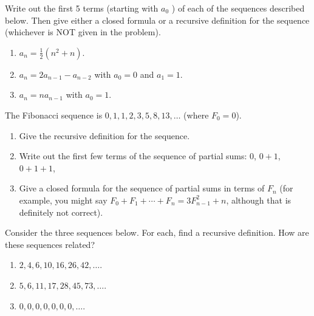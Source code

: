 \documentclass[11pt,]{book}
\theoremstyle{ptxplainnotitle}
\theoremstyle{ptxplaintitle}
\theoremstyle{ptxdefinitionnotitle}
\theoremstyle{ptxdefinitiontitle}
\theoremstyle{ptxdefinitionnotitle}
\theoremstyle{ptxdefinitiontitle}
\theoremstyle{ptxdefinitionnotitle}
\theoremstyle{ptxdefinitiontitle}
\theoremstyle{ptxdefinitiontitlenonumber}
\theoremstyle{ptxdefinitiontitlenonumber}
\numberwithin{equation}{chapter}
\begin{document}
\begin{divisionexercise}{3}\hypertarget{exercise-3}{}
\hypertarget{p-121}{}%
Write out the first 5 terms (starting with \(a_0\) ) of each of the sequences described below.  Then give either a closed formula or a recursive definition for the sequence (whichever is NOT given in the problem). \leavevmode%
\begin{enumerate}[label=(\alph*)]
\item\hypertarget{li-82}{}\hypertarget{p-122}{}%
\(a_n = \frac{1}{2}(n^2 + n)\).%
\item\hypertarget{li-83}{}\hypertarget{p-123}{}%
\(a_n = 2a_{n-1} - a_{n-2}\) with \(a_0 = 0\) and \(a_1 = 1\).%
\item\hypertarget{li-84}{}\hypertarget{p-124}{}%
\(a_n = na_{n-1}\) with \(a_0 = 1\).%
\end{enumerate}
%
\end{divisionexercise}%
\begin{divisionexercise}{4}\hypertarget{exercise-4}{}
\hypertarget{p-129}{}%
The Fibonacci sequence is \(0, 1, 1, 2, 3, 5, 8, 13, \ldots\) (where \(F_0 = 0\)).%
\par
\hypertarget{p-130}{}%
\leavevmode%
\begin{enumerate}[label=(\alph*)]
\item\hypertarget{li-88}{}\hypertarget{p-131}{}%
Give the recursive definition for the sequence.%
\item\hypertarget{li-89}{}\hypertarget{p-132}{}%
Write out the first few terms of the sequence of partial sums: \(0\), \(0+1\), \(0+1+1\),\textellipsis{}%
\item\hypertarget{li-90}{}\hypertarget{p-133}{}%
Give a closed formula for the sequence of partial sums in terms of \(F_n\)\label{notation-3}
 (for example, you might say \(F_0 + F_1 + \cdots + F_n = 3F_{n-1}^2 + n\), although that is definitely not correct).%
\end{enumerate}
%
\end{divisionexercise}%
\begin{divisionexercise}{5}\hypertarget{exercise-5}{}
\hypertarget{p-135}{}%
Consider the three sequences below. For each, find a recursive definition. How are these sequences related?%
\par
\hypertarget{p-136}{}%
\leavevmode%
\begin{enumerate}[label=(\alph*)]
\item\hypertarget{li-94}{}\(2, 4, 6, 10, 16, 26, 42, \ldots\).%
\item\hypertarget{li-95}{}\(5, 6, 11, 17, 28, 45, 73, \ldots\).%
\item\hypertarget{li-96}{}\(0, 0 , 0 , 0 , 0 , 0 , 0 ,\ldots\).%
\end{enumerate}
%
\end{divisionexercise}%
\end{document}
